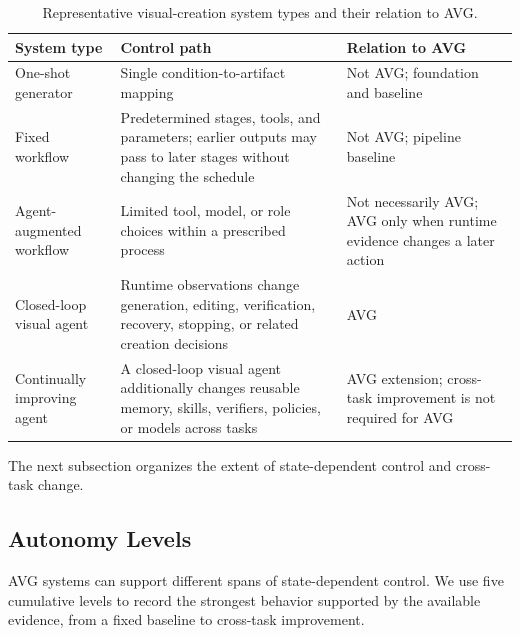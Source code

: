 \begin{table}[t]
  \caption{Representative visual-creation system types and their relation to AVG.}
  \label{tab:boundary}
  \small
  \begin{tabularx}{\columnwidth}{@{}p{}p{}p{}@{}}
    \toprule
    System type & Control path & Relation to AVG \\
    \midrule
    One-shot generator & Single condition-to-artifact mapping & Not AVG; foundation and baseline \\
    Fixed workflow & Predetermined stages, tools, and parameters; earlier outputs may pass to later stages without changing the schedule & Not AVG; pipeline baseline \\
    Agent-augmented workflow & Limited tool, model, or role choices within a prescribed process & Not necessarily AVG; AVG only when runtime evidence changes a later action \\
    Closed-loop visual agent & Runtime observations change generation, editing, verification, recovery, stopping, or related creation decisions & AVG \\
    Continually improving agent & A closed-loop visual agent additionally changes reusable memory, skills, verifiers, policies, or models across tasks & AVG extension; cross-task improvement is not required for AVG \\
    \bottomrule
  \end{tabularx}
\end{table}

The next subsection organizes the extent of state-dependent control and cross-task change.

\subsection{Autonomy Levels}
\label{sec:agentic-visual-generation-autonomy}

AVG systems can support different spans of state-dependent control. We use five cumulative levels to record the strongest behavior supported by the available evidence, from a fixed baseline to cross-task improvement.

